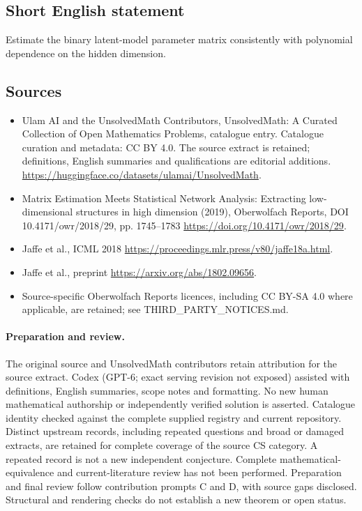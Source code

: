 \documentclass[11pt]{article}
\begin{document}
\subsection{Short English statement}
Estimate the binary latent-model parameter matrix consistently with polynomial dependence on the hidden dimension.
\subsection{Sources}
\begin{itemize}
\item[\hypertarget{source:statement:1}{S1}] Ulam AI and the UnsolvedMath Contributors, UnsolvedMath: A Curated Collection of Open Mathematics Problems, catalogue entry. Catalogue curation and metadata: CC BY 4.0. The source extract is retained; definitions, English summaries and qualifications are editorial additions.
\url{https://huggingface.co/datasets/ulamai/UnsolvedMath}.
\item[\hypertarget{source:statement:2}{S2}] Matrix Estimation Meets Statistical Network Analysis: Extracting low-dimensional structures in high dimension (2019), Oberwolfach Reports, DOI 10.4171/owr/2018/29, pp. 1745--1783
\url{https://doi.org/10.4171/owr/2018/29}.
\item[\hypertarget{source:statement:3}{S3}] Jaffe et al., ICML 2018
\url{https://proceedings.mlr.press/v80/jaffe18a.html}.
\item[\hypertarget{source:statement:4}{S4}] Jaffe et al., preprint
\url{https://arxiv.org/abs/1802.09656}.
\item Source-specific Oberwolfach Reports licences, including CC BY-SA 4.0 where applicable, are retained; see THIRD\_PARTY\_NOTICES.md.
\end{itemize}
\paragraph{Preparation and review.}
The original source and UnsolvedMath contributors retain attribution for the source extract. Codex (GPT-6; exact serving revision not exposed) assisted with definitions, English summaries, scope notes and formatting. No new human mathematical authorship or independently verified solution is asserted. Catalogue identity checked against the complete supplied registry and current repository. Distinct upstream records, including repeated questions and broad or damaged extracts, are retained for complete coverage of the source CS category. A repeated record is not a new independent conjecture. Complete mathematical-equivalence and current-literature review has not been performed. Preparation and final review follow contribution prompts C and D, with source gaps disclosed. Structural and rendering checks do not establish a new theorem or open status.
\label{end:statement}
\end{document}
